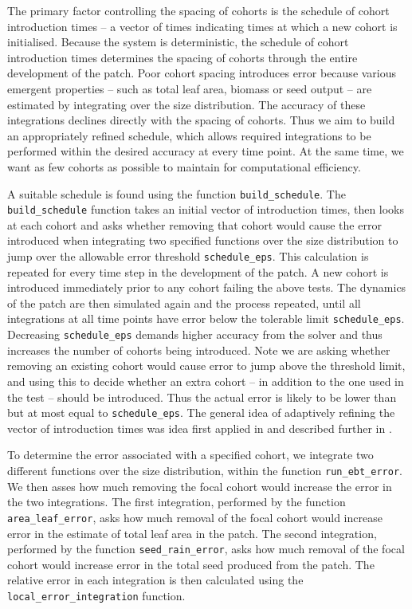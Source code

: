 \documentclass[10pt,twoside]{article}
\begin{document}
The primary factor controlling the spacing of cohorts is the schedule of
cohort introduction times -- a vector of times indicating times at which
a new cohort is initialised. Because the system is deterministic, the
schedule of cohort introduction times determines the spacing of cohorts
through the entire development of the patch. Poor cohort spacing
introduces error because various emergent properties -- such as total
leaf area, biomass or seed output -- are estimated by integrating over
the size distribution. The accuracy of these integrations declines
directly with the spacing of cohorts. Thus we aim to build an
appropriately refined schedule, which allows required integrations to be
performed within the desired accuracy at every time point. At the same
time, we want as few cohorts as possible to maintain for computational
efficiency.

A suitable schedule is found using the function \texttt{build\_schedule}.
The \texttt{build\_schedule} function takes an
initial vector of introduction times, then looks at each cohort and asks
whether removing that cohort would cause the error introduced when
integrating two specified functions over the size distribution to jump
over the allowable error threshold \texttt{schedule\_eps}. This
calculation is repeated for every time step in the development of the
patch. A new cohort is introduced immediately prior to any cohort
failing the above tests. The dynamics of the patch are
then simulated again and the process repeated, until all integrations at
all time points have error below the tolerable limit
\texttt{schedule\_eps}. Decreasing \texttt{schedule\_eps} demands higher
accuracy from the solver and thus increases the number of cohorts being
introduced. Note we are asking whether removing an existing cohort would
cause error to jump above the threshold limit, and using this to decide
whether an extra cohort -- in addition to the one used in the test --
should be introduced. Thus the actual error is likely to
be lower than but at most equal to \texttt{schedule\_eps}. The general idea
of adaptively refining the vector of introduction times was idea first applied
in \citet{Falster-2011} and described further in \citet{Falster-2015}.

To determine the error associated with a specified cohort, we integrate
two different functions over the size distribution, within the function
\texttt{run\_ebt\_error}. We then asses how much removing the focal
cohort would increase the error in the two integrations. The first
integration, performed by the function \texttt{area\_leaf\_error}, asks
how much removal of the focal cohort would increase error in the
estimate of total leaf area in the patch. The second integration,
performed by the function \texttt{seed\_rain\_error}, asks how much
removal of the focal cohort would increase error in the total seed
produced from the patch. The relative error in each integration is then
calculated using the \texttt{local\_error\_integration} function.
\end{document}

